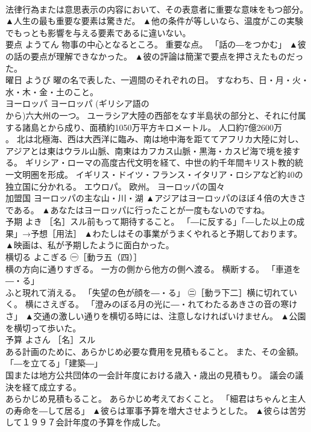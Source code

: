 \documentclass[8pt]{extreport}
\begin{document}
\begin{CJK}{UTF8}{min}
\\	法律行為または意思表示の内容において、その表意者に重要な意味をもつ部分。	▲人生の最も重要な要素は驚きだ。 ▲他の条件が等しいなら、温度がこの実験でもっとも影響を与える要素であるに違いない。
\\	要点	ようてん	物事の中心となるところ。 重要な点。 「話の―をつかむ」	▲彼の話の要点が理解できなかった。 ▲彼の評論は簡潔で要点を押さえたものだった。
\\	曜日	ようび	曜の名で表した、一週間のそれぞれの日。 すなわち、日・月・火・水・木・金・土のこと。	
\\	ヨーロッパ	ヨーロッパ	(ギリシア語の
\\	から)六大州の一つ。 ユーラシア大陸の西部をなす半島状の部分と、それに付属する諸島とから成り、面積約1050万平方キロメートル。 人口約7億2600万
\\	。 北は北極海、西は大西洋に臨み、南は地中海を距ててアフリカ大陸に対し、アジアとは東はウラル山脈、南東はカフカス山脈・黒海・カスピ海で境を接する。 ギリシア・ローマの高度古代文明を経て、中世の約千年間キリスト教的統一文明圏を形成。 イギリス・ドイツ・フランス・イタリア・ロシアなど約40の独立国に分かれる。 エウロパ。 欧州。 ヨーロッパの国々 
\\	加盟国 ヨーロッパの主な山・川・湖	▲アジアはヨーロッパのほぼ４倍の大きさである。 ▲あなたはヨーロッパに行ったことが一度もないのですね。
\\	予期	よき	［名］スル前もって期待すること。 「―に反する」「―した以上の成果」→予想［用法］	▲わたしはその事業がうまくやれると予期しております。 ▲映画は、私が予期したように面白かった。
\\	横切る	よこぎる	㊀［動ラ五（四）］ 
\\	横の方向に通りすぎる。 一方の側から他方の側へ渡る。 横断する。 「車道を―・る」 
\\	ふと現れて消える。 「失望の色が顔を―・る」 ㊁［動ラ下二］横に切れていく。 横にさえぎる。 「澄みのぼる月の光に―・れてわたるあきさの音の寒けさ」	▲交通の激しい通りを横切る時には、注意しなければいけません。 ▲公園を横切って歩いた。
\\	予算	よさん	［名］スル 
\\	ある計画のために、あらかじめ必要な費用を見積もること。 また、その金額。 「―を立てる」「建築―」 
\\	国または地方公共団体の一会計年度における歳入・歳出の見積もり。 議会の議決を経て成立する。 
\\	あらかじめ見積もること。 あらかじめ考えておくこと。 「細君はちゃんと主人の寿命を―して居る」	▲彼らは軍事予算を増大させようとした。 ▲彼らは苦労して１９９７会計年度の予算を作成した。

\end{CJK}
\end{document}
